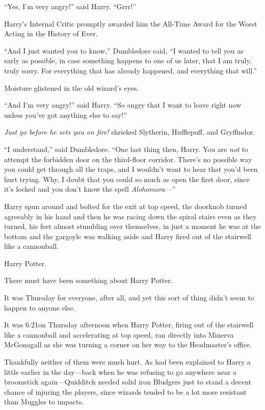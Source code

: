 “Yes, I’m very angry!” said Harry.
“Grrr!”

Harry’s Internal Critic promptly awarded him the All-Time Award for the Worst Acting in the History of Ever.

“And I just wanted you to know,” Dumbledore said,
“I wanted to tell you as early as possible, in case something happens to one of us later, that I am truly, truly sorry. For everything that has already happened, and everything that will.”

Moisture glistened in the old wizard’s eyes.

“And I’m very angry!” said Harry.
“So angry that I want to leave right now unless you’ve got anything else to say!”

\emph{Just \emph{go} before he sets you on fire!} shrieked Slytherin, Hufflepuff, and Gryffindor.

“I understand,” said Dumbledore.
“One last thing then, Harry. You are \emph{not} to attempt the forbidden door on the third-floor corridor. There’s no possible way you could get through all the traps, and I wouldn’t want to hear that you’d been hurt trying. Why, I doubt that you could so much as open the first door, since it’s locked and you don’t know the spell \emph{Alohomora—}”

Harry spun around and bolted for the exit at top speed, the doorknob turned agreeably in his hand and then he was racing down the spiral stairs even as they turned, his feet almost stumbling over themselves, in just a moment he was at the bottom and the gargoyle was walking aside and Harry fired out of the stairwell like a cannonball.

\later

Harry Potter.

There must have been something about Harry Potter.

It was Thursday for everyone, after all, and yet this sort of thing didn’t seem to happen to anyone else.

It was 6:21\pm on Thursday afternoon when Harry Potter, firing out of the stairwell like a cannonball and accelerating at top speed, ran directly into Minerva McGonagall as she was turning a corner on her way to the Headmaster’s office.

Thankfully neither of them were much hurt. As had been explained to Harry a little earlier in the day—back when he was refusing to go anywhere near a broomstick again—Quidditch needed solid iron Bludgers just to stand a decent chance of injuring the players, since wizards tended to be a lot more resistant than Muggles to impacts.

